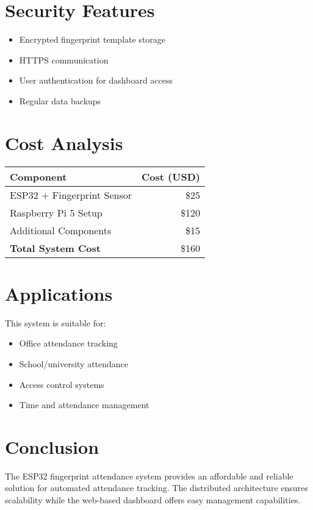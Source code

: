 \documentclass[10pt,a4paper]{article}
\begin{document}
\section{Security Features}

\begin{itemize}
    \item Encrypted fingerprint template storage
    \item HTTPS communication
    \item User authentication for dashboard access
    \item Regular data backups
\end{itemize}

\section{Cost Analysis}

\begin{center}
\begin{tabular}{|l|r|}
\hline
\textbf{Component} & \textbf{Cost (USD)} \\
\hline
ESP32 + Fingerprint Sensor & \$25 \\
Raspberry Pi 5 Setup & \$120 \\
Additional Components & \$15 \\
\hline
\textbf{Total System Cost} & \$160 \\
\hline
\end{tabular}
\end{center}

\section{Applications}

This system is suitable for:
\begin{itemize}
    \item Office attendance tracking
    \item School/university attendance
    \item Access control systems
    \item Time and attendance management
\end{itemize}

\section{Conclusion}

The ESP32 fingerprint attendance system provides an affordable and reliable solution for automated attendance tracking. The distributed architecture ensures scalability while the web-based dashboard offers easy management capabilities.
\end{document}
